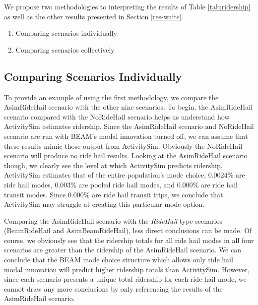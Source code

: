 \documentclass[fancy, masters]{byuthesis}
\providecommand{\tightlist}{%
  \setlength{\itemsep}{0pt}\setlength{\parskip}{0pt}}
\begin{document}
We propose two methodologies to interpreting the results of Table \ref{tab:ridership} as well as the other results presented in Section \ref{res-waits}.

\begin{enumerate}
\def\labelenumi{\arabic{enumi}.}
\tightlist
\item
  Comparing scenarios individually
\item
  Comparing scenarios collectively
\end{enumerate}

\hypertarget{res-ind}{%
\subsection{Comparing Scenarios Individually}\label{res-ind}}

To provide an example of using the first methodology, we compare the AsimRideHail scenario with the other nine scenarios. To begin, the AsimRideHail scenario compared with the NoRideHail scenario helps us understand how ActivitySim estimates ridership. Since the AsimRideHail scenario and NoRideHail scenario are run with BEAM's modal innovation turned off, we can assume that these results mimic those output from ActivitySim. Obviously the NoRideHail scenario will produce no ride hail results. Looking at the AsimRideHail scenario though, we clearly see the level at which ActivitySim predicts ridership. ActivitySim estimates that of the entire population's mode choice, 0.0024\% are ride hail modes, 0.003\% are pooled ride hail modes, and 0.000\% are ride hail transit modes. Since 0.000\% are ride hail transit trips, we conclude that ActivitySim may struggle at creating this particular mode option.

Comparing the AsimRideHail scenario with the \emph{RideHail} type scenarios (BeamRideHail and AsimBeamRideHail), less direct conclusions can be made. Of course, we obviously see that the ridership totals for all ride hail modes in all four scenarios are greater than the ridership of the AsimRideHail scenario. We can conclude that the BEAM mode choice structure which allows only ride hail modal innovation will predict higher ridership totals than ActivitySim. However, since each scenario presents a unique total ridership for each ride hail mode, we cannot draw any more conclusions by only referencing the results of the AsimRideHail scenario.
\end{document}
